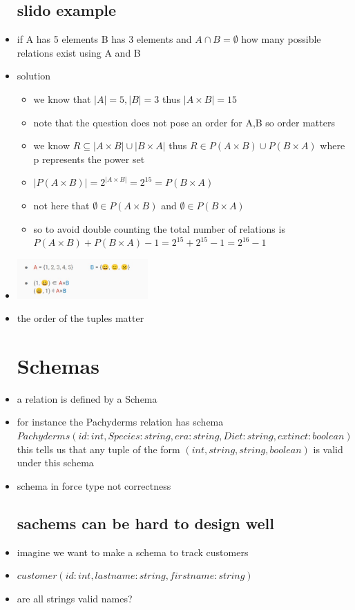 \documentclass{article}
\begin{document}
\begin{itemize}
\subsection{slido example}
\item if A has 5 elements B has 3 elements and $A\cap B= \emptyset$ how many possible relations exist using A and B
\item solution 
\begin{itemize}
    \item we know that $|A|=5, |B|=3$ thus $|A\times B|=15$
    \item note that the question does not pose an order for A,B so order matters
    \item we know $R \subseteq |A\times B|\cup |B\times A|$ thus $R\in P(A\times B)\cup P(B\times A)$ where p represents the power set 
    \item $|P(A\times B)|=2^|A\times B|=2^{15}=P(B\times A)$
    \item not here that $\emptyset \in P(A\times B)$ and  $\emptyset \in P(B\times A)$ 
    \item so to avoid double counting the total number of relations is $P(A\times B)+P(B\times A)-1=2^15+2^{15}-1=2^{16}-1$
\end{itemize}
\item \includegraphics[width=5cm]{lecture notes/week 2/immages/w_1_2.jpg}
\item the order of the tuples matter
\section{Schemas}
\item a relation is defined by a Schema
\item for instance the Pachyderms relation has schema $Pachyderms(id:int, Species: string, era:string, Diet:string, extinct:boolean)$ this tells us that any tuple of the form $(int, string, string, boolean)$ is valid under this schema 
\item schema in force type not correctness
\subsection{sachems can be hard to design well}
\item imagine we want to make a schema to track customers
\item $customer(id :int, lastname:string, firstname:string)$
\item are all strings valid names?


\end{itemize}
\end{document}

